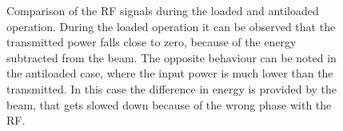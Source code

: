 \begin{figure}[h]
\centering
\caption{Comparison of the RF signals during the loaded and antiloaded operation. During the loaded operation it can be observed that the transmitted power falls close to zero, because of the energy subtracted from the beam. The opposite behaviour can be noted in the antiloaded case, where the input power is much lower than the transmitted. In this case the difference in energy is provided by the beam, that gets slowed down because of the wrong phase with the RF. }
 \label{RF_load}
 \end{figure}



